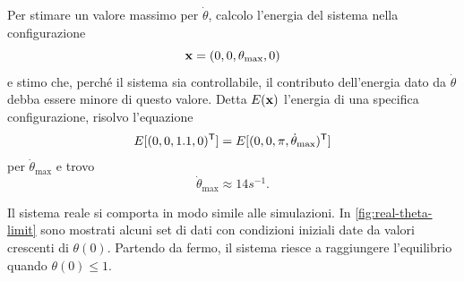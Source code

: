 Per stimare un valore massimo per $\dot \theta$, calcolo l'energia del
sistema nella configurazione
\begin{equation*}
    \mathbf{x} = (0, 0, \theta_{\max}, 0)
\end{equation*}
e stimo che, perché il sistema sia controllabile,
il contributo dell'energia dato da $\dot \theta$ debba essere
minore di questo valore.
Detta $E(\mathbf{x})$ l'energia di una specifica configurazione, risolvo l'equazione
\begin{equation*}
    E[(0, 0, 1.1, 0)^{\mathsf{T}}] = E[(0, 0, \pi, \dot \theta_{\max})^{\mathsf{T}}]
\end{equation*}
per $\dot \theta_{\max}$ e trovo
\begin{equation*}
    \dot \theta_{\max} \approx 14 s^{-1}.
\end{equation*}

Il sistema reale si comporta in modo simile alle simulazioni.
In \autoref{fig:real-theta-limit} sono mostrati alcuni set di dati
con condizioni iniziali date da valori crescenti di $\theta(0)$.
Partendo da fermo, il sistema riesce a raggiungere l'equilibrio quando
$\theta(0) \leq 1$. 

